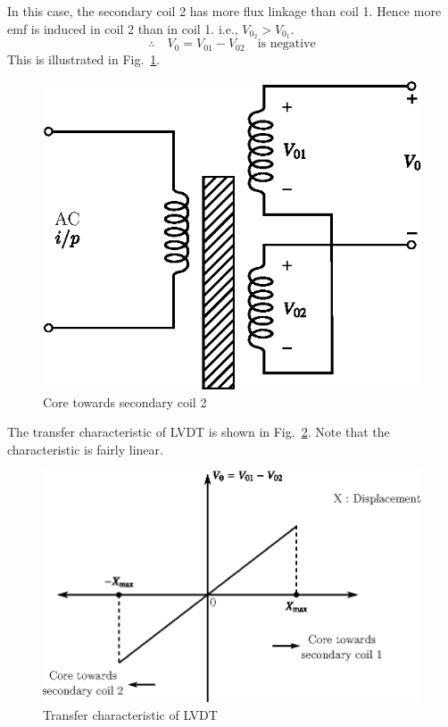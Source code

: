 \eject


In this case, the secondary coil 2 has more flux linkage than coil 1. Hence more emf is induced in coil 2 than in coil 1. i.e., $V_{0_2}>V_{0_1}$.
$$
\therefore\quad V_{0}=V_{01}-V_{02}\quad\text{is negative}
$$
This is illustrated in Fig.~\ref{fig8.17}.
\begin{figure}[H]
\centering
\includegraphics[scale=.9]{chap8/fig8.17.eps}
\caption{Core towards secondary coil 2}\label{fig8.17}
\end{figure}

The transfer characteristic of LVDT is shown in Fig.~\ref{fig8.18}. Note that the characteristic is fairly linear.
\begin{figure}[H]
\centering
\includegraphics[scale=.9]{chap8/fig8.18.eps}
\caption{Transfer characteristic of LVDT}\label{fig8.18}
\end{figure}

